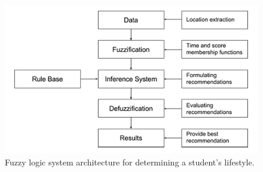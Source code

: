 \documentclass[conference]{IEEEtran}
\begin{document}
\begin{figure}[h!]
\centering
\captionsetup{justification=centering}
\noindent \includegraphics[scale=0.45]{fig1}
\caption{Fuzzy logic system architecture for determining a student\rq s lifestyle.}
\end{figure}


%
%

\end{document}
